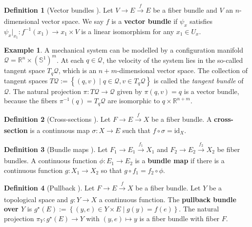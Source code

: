 \documentclass[12pt]{article}
\theoremstyle{definition}
\newtheorem{defn}{Definition}
\newtheorem{example}{Example}
\begin{document}
\begin{defn}[Vector bundles \cite{topology-fiber-bundles}]
    Let \(V \rightarrow E \xrightarrow[]{f} E\) be a fiber bundle and \(V\) an
    \(n\)-dimensional vector space. We say \(f\) is a
    \textbf{vector bundle} if \(\psi_x\) satisfies
    \(\psi_x \vert_{x_1} : f^{-1}(x_1) \rightarrow {x_1}\times V\) is a linear
    isomorphism for any \(x_1 \in U_x\).
\end{defn}

\begin{example}\label{ex:tangent-bundle}
    A mechanical system can be modelled by a configuration manifold
    \(\mathcal{Q} = \mathbb{R}^n \times (\mathbb{S}^1)^m\). At each
    \(q \in \mathcal{Q}\), the velocity of the system lies in the so-called
    tangent space \(T_q\mathcal{Q}\), which is an \(n+m\)-dimensional vector
    space. 
    The collection of tangent spaces
    \(T\mathcal{Q} := \left\{(q,v) \mid q \in \mathcal{Q}, v \in
    T_q\mathcal{Q}\right\}\) is called the \textit{tangent bundle} of
    \(\mathcal{Q}\). The natural
    projection \(\pi : T\mathcal{Q} \rightarrow \mathcal{Q}\) given by 
    \(\pi(q,v) = q\) is a vector bundle, because the fibers 
    \(\pi^{-1}(q) = T_q\mathcal{Q}\) are isomorphic to 
    \({q} \times \mathbb{R}^{n+m}\).
\end{example}

\begin{defn}[Cross-sections \cite{topology-fiber-bundles}]
    Let \(F \rightarrow E \xrightarrow[]{f} X\) be a fiber bundle.
    A \textbf{cross-section} is a continuous map \(\sigma : X \rightarrow E\)
    such that \(f \circ \sigma = \text{id}_X\).
\end{defn}

\begin{defn}[Bundle maps \cite{topology-fiber-bundles}]
    Let \(F_1 \rightarrow E_1 \xrightarrow[]{f_1} X_1\) and 
    \(F_2 \rightarrow E_2 \xrightarrow[]{f_2} X_2\) be fiber bundles. A
    continuous function \(\phi : E_1 \rightarrow E_2\) is a \textbf{bundle map}
    if there is a continuous function \(g : X_1 \rightarrow X_2\) so that
    \(g \circ f_1 = f_2 \circ \phi\).
\end{defn}

\begin{defn}[Pullback \cite{topology-fiber-bundles}]
    Let \(F \rightarrow E \xrightarrow[]{f} X\) be a fiber bundle. Let \(Y\) be
    a topological space and \(g : Y \rightarrow X\) a continuous function. The
    \textbf{pullback bundle over \(Y\)} is 
    \(g^\star(E) := \left\{ (y,e)\in Y \times E \mid g(y) = f(e)\right\}\). The
    natural projection \(\pi_Y : g^\star(E) \rightarrow Y\) with 
    \((y,e) \mapsto y\) is a fiber bundle with fiber \(F\).
\end{defn}
\end{document}

